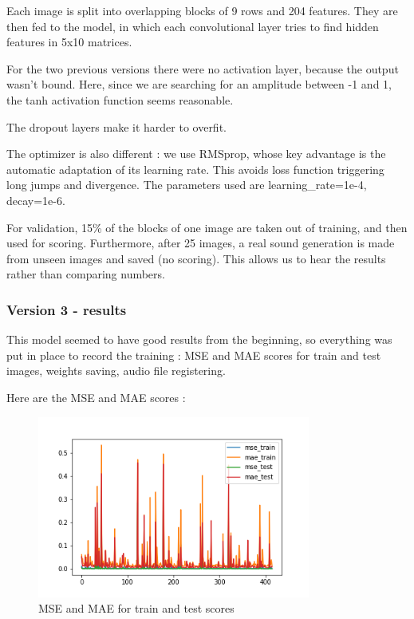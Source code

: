 \documentclass[12pt, twoside]{article}
\begin{document}
Each image is split into overlapping blocks of 9 rows and 204 features. They are then fed to the model, in which each convolutional layer tries to find hidden features in 5x10 matrices. 

For the two previous versions there were no activation layer, because the output wasn't bound. Here, since we are searching for an amplitude between -1 and 1, the tanh activation function seems reasonable.

The dropout layers make it harder to overfit.

The optimizer is also different : we use RMSprop, whose key advantage is the automatic adaptation of its learning rate. This avoids loss function triggering long jumps and divergence. The parameters used are learning\_rate=1e-4, decay=1e-6.

For validation, 15\% of the blocks of one image are taken out of training, and then used for scoring. Furthermore, after 25 images, a real sound generation is made from unseen images and saved (no scoring). This allows us to hear the results rather than comparing numbers.

\subsubsection{Version 3 - results}
This model seemed to have good results from the beginning, so everything was put in place to record the training : MSE and MAE scores for train and test images, weights saving, audio file registering.

Here are the MSE and MAE scores :

\begin{figure}
	\centering
	\includegraphics[width=0.8\textwidth]{../images/res_plot_v4.png}
	\caption{MSE and MAE for train and test scores}
	\label{scoresv3}
\end{figure}
\end{document}

